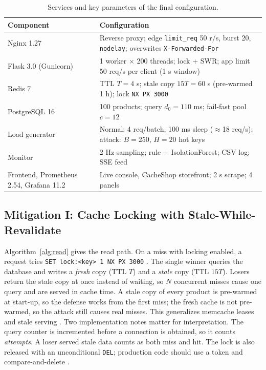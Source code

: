 \documentclass[journal]{IEEEtran}
\begin{document}
\begin{table}[t]
\centering
\caption{Services and key parameters of the final configuration.}
\label{tab:params}
\footnotesize
\begin{tabularx}{\columnwidth}{@{}L{2.2cm}Y@{}}
\toprule
Component & Configuration \\
\midrule
Nginx 1.27 & Reverse proxy; edge \texttt{limit\_req} 50 r/s, burst 20, \texttt{nodelay}; overwrites \texttt{X-Forwarded-For} \\
Flask 3.0 (Gunicorn) & 1 worker $\times$ 200 threads; lock + SWR; app limit 50 req/s per client (1 s window) \\
Redis 7 & TTL $T=4$ s; stale copy $15T=60$ s (pre-warmed 1 h); lock \texttt{NX PX 3000} \\
PostgreSQL 16 & 100 products; query $d_0=110$ ms; fail-fast pool $c=12$ \\
Load generator & Normal: 4 req/batch, 100 ms sleep ($\approx$18 req/s); attack: $B=250$, $H=20$ hot keys \\
Monitor & 2 Hz sampling; rule + IsolationForest; CSV log; SSE feed \\
Frontend, Prometheus 2.54, Grafana 11.2 & Live console, CacheShop storefront; 2 s scrape; 4 panels \\
\bottomrule
\end{tabularx}
\end{table}

\subsection{Mitigation I: Cache Locking with Stale-While-Revalidate}
Algorithm~\ref{alg:read} gives the read path. On a miss with locking enabled, a request
tries \texttt{SET lock:<key> 1 NX PX 3000} \cite{redisdocs}. The single winner queries
the database and writes a \emph{fresh} copy (TTL $T$) and a \emph{stale} copy (TTL
$15T$). Losers return the stale copy at once instead of waiting, so $N$ concurrent
misses cause one query and are served in cache time. A stale copy of every product is
pre-warmed at start-up, so the defense works from the first miss; the fresh cache is not
pre-warmed, so the attack still causes real misses. This generalizes memcache leases
\cite{nishtala2013} and stale serving \cite{rfc5861,nygard2018}. Two implementation
notes matter for interpretation. The query counter is incremented before a connection is
obtained, so it counts \emph{attempts}. A loser served stale data counts as both miss and
hit. The lock is also released with an unconditional \texttt{DEL}; production code
should use a token and compare-and-delete \cite{kleppmann2016}.
\end{document}
